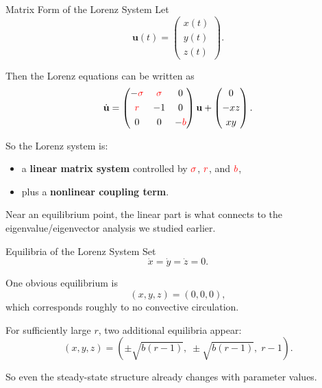 \documentclass[aspectratio=169]{beamer}
\begin{document}
\begin{frame}{Matrix Form of the Lorenz System}
Let
\begin{equation*}
\mathbf{u}(t)=
\begin{pmatrix}
x(t)\\[0.3em]
y(t)\\[0.3em]
z(t)
\end{pmatrix}.
\end{equation*}

Then the Lorenz equations can be written as
\begin{equation*}
\dot{\mathbf{u}}
=
\begin{pmatrix}
-\textcolor{red}{\sigma} & \textcolor{red}{\sigma} & 0\\[0.3em]
\textcolor{red}{r} & -1 & 0\\[0.3em]
0 & 0 & -\textcolor{red}{b}
\end{pmatrix}
\mathbf{u}
+
\begin{pmatrix}
0\\[0.3em]
-xz\\[0.3em]
xy
\end{pmatrix}.
\end{equation*}

\vspace{0.5em}

So the Lorenz system is:
\begin{itemize}
\item a \textbf{linear matrix system} controlled by
$\textcolor{red}{\sigma}$, $\textcolor{red}{r}$, and $\textcolor{red}{b}$,
\item plus a \textbf{nonlinear coupling term}.
\end{itemize}

Near an equilibrium point, the linear part is what connects to the eigenvalue/eigenvector analysis we studied earlier.
\end{frame}

\begin{frame}{Equilibria of the Lorenz System}
Set
\begin{equation*}
\dot{x}=\dot{y}=\dot{z}=0.
\end{equation*}

One obvious equilibrium is
\begin{equation*}
(x,y,z)=(0,0,0),
\end{equation*}
which corresponds roughly to no convective circulation.

For sufficiently large $r$, two additional equilibria appear:
\begin{equation*}
(x,y,z)=\left(\pm\sqrt{b(r-1)},\;\pm\sqrt{b(r-1)},\;r-1\right).
\end{equation*}

So even the steady-state structure already changes with parameter values.
\end{frame}
\end{document}
